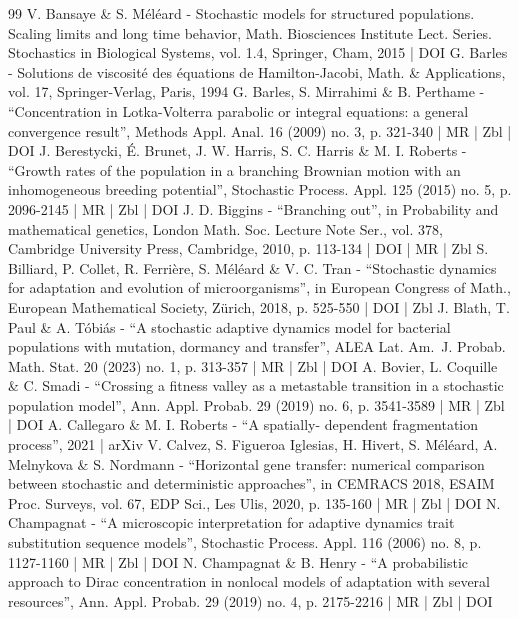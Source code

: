 \begin{thebibliography}{99}
V. Bansaye \& S. Méléard - Stochastic models for structured populations. Scaling limits and long time behavior, Math. Biosciences Institute Lect. Series. Stochastics in Biological Systems, vol. 1.4, Springer, Cham, 2015 | DOI
G. Barles - Solutions de viscosité des équations de Hamilton-Jacobi, Math. \& Applications, vol. 17, Springer-Verlag, Paris, 1994
G. Barles, S. Mirrahimi \& B. Perthame - “Concentration in Lotka-Volterra parabolic or integral equations: a general convergence result”, Methods Appl. Anal. 16 (2009) no. 3, p. 321-340 | MR | Zbl | DOI
J. Berestycki, É. Brunet, J. W. Harris, S. C. Harris \& M. I. Roberts - “Growth rates of the population in a branching Brownian motion with an inhomogeneous breeding potential”, Stochastic Process. Appl. 125 (2015) no. 5, p. 2096-2145 | MR | Zbl | DOI
J. D. Biggins - “Branching out”, in Probability and mathematical genetics, London Math. Soc. Lecture Note Ser., vol. 378, Cambridge University Press, Cambridge, 2010, p. 113-134 | DOI | MR | Zbl
S. Billiard, P. Collet, R. Ferrière, S. Méléard \& V. C. Tran - “Stochastic dynamics for adaptation and evolution of microorganisms”, in European Congress of Math., European Mathematical Society, Zürich, 2018, p. 525-550 | DOI | Zbl
J. Blath, T. Paul \& A. Tóbiás - “A stochastic adaptive dynamics model for bacterial populations with mutation, dormancy and transfer”, ALEA Lat. Am. J. Probab. Math. Stat. 20 (2023) no. 1, p. 313-357 | MR | Zbl | DOI
A. Bovier, L. Coquille \& C. Smadi - “Crossing a fitness valley as a metastable transition in a stochastic population model”, Ann. Appl. Probab. 29 (2019) no. 6, p. 3541-3589 | MR | Zbl | DOI
A. Callegaro \& M. I. Roberts - “A spatially- dependent fragmentation process”, 2021 | arXiv
V. Calvez, S. Figueroa Iglesias, H. Hivert, S. Méléard, A. Melnykova \& S. Nordmann - “Horizontal gene transfer: numerical comparison between stochastic and deterministic approaches”, in CEMRACS 2018, ESAIM Proc. Surveys, vol. 67, EDP Sci., Les Ulis, 2020, p. 135-160 | MR | Zbl | DOI
N. Champagnat - “A microscopic interpretation for adaptive dynamics trait substitution sequence models”, Stochastic Process. Appl. 116 (2006) no. 8, p. 1127-1160 | MR | Zbl | DOI
N. Champagnat \& B. Henry - “A probabilistic approach to Dirac concentration in nonlocal models of adaptation with several resources”, Ann. Appl. Probab. 29 (2019) no. 4, p. 2175-2216 | MR | Zbl | DOI

\end{thebibliography}
